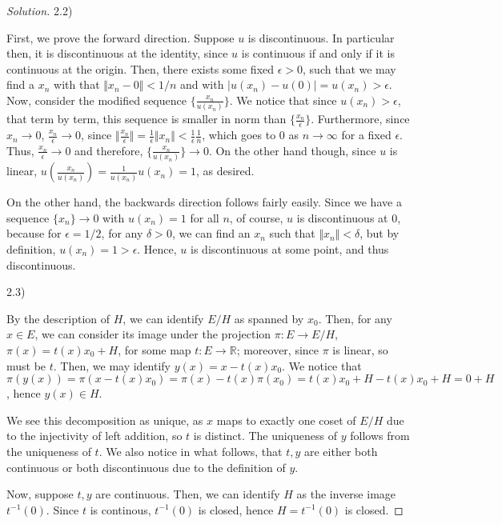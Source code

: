 \documentclass[10pt]{article}
\begin{document}
\begin{proof}[Solution]
2.2)

First, we prove the forward direction. Suppose $u$ is discontinuous. In particular then, it is discontinuous at the identity, since $u$ is continuous if and only if it is continuous at the origin. Then, there exists some fixed $\epsilon > 0$, such that we may find a $x_n$ with that $\Vert x_n - 0 \Vert < 1/n$ and with $| u(x_n)  - u(0) | = u(x_n) > \epsilon$. Now, consider the modified sequence $\{ \frac{x_n}{u(x_n)} \}$. We notice that since $u(x_n) > \epsilon$, that term by term, this sequence is smaller in norm than $\{ \frac{x_n}{\epsilon} \}$. Furthermore, since $x_n \to 0$, $\frac{x_n}{\epsilon} \to 0$, since $\Vert \frac{x_n}{\epsilon} \Vert = \frac{1}{\epsilon} \Vert x_n \Vert < \frac{1}{\epsilon} \frac{1}{n}$, which goes to 0 as $n \to \infty$ for a fixed $\epsilon$. Thus, $\frac{x_n}{\epsilon} \to 0$ and therefore, $\{ \frac{x_n}{u(x_n)} \} \to 0$. On the other hand though, since $u$ is linear, $u\left( \frac{x_n}{u(x_n)} \right) = \frac{1}{u(x_n)} u(x_n) = 1$, as desired.

On the other hand, the backwards direction follows fairly easily. Since we have a sequence $\{ x_n \} \to 0$ with $u(x_n) = 1$ for all $n$, of course, $u$ is discontinuous at $0$, because for $\epsilon = 1/2$, for any $\delta > 0$, we can find an $x_n$ such that $\Vert x_n \Vert < \delta$, but by definition, $u(x_n) = 1 > \epsilon$. Hence, $u$ is discontinuous at some point, and thus discontinuous.

2.3)

By the description of $H$, we can identify $E/H$ as spanned by $x_0$. Then, for any $x \in E$, we can consider its image under the projection $\pi: E \to E/H$, $\pi(x) = t(x)x_0  + H$, for some map $t: E \to \mathbb{R}$; moreover, since $\pi$ is linear, so must be $t$. Then, we may identify $y(x) = x - t(x)x_0$. We notice that $\pi(y(x)) = \pi(x - t(x)x_0) = \pi(x) - t(x)\pi(x_0) = t(x) x_0 + H - t(x) x_0 + H = 0 + H$, hence $y(x) \in H$.

We see this decomposition as unique, as $x$ maps to exactly one coset of $E/H$ due to the injectivity of left addition, so $t$ is distinct. The uniqueness of $y$ follows from the uniqueness of $t$. We also notice in what follows, that $t, y$ are either both continuous or both discontinuous due to the definition of $y$.

Now, suppose $t, y$ are continuous. Then, we can identify $H$ as the inverse image $t^{-1}(0)$. Since $t$ is continous, $t^{-1}(0)$ is closed, hence $H = t^{-1}(0)$ is closed.


\end{proof}
\end{document}

